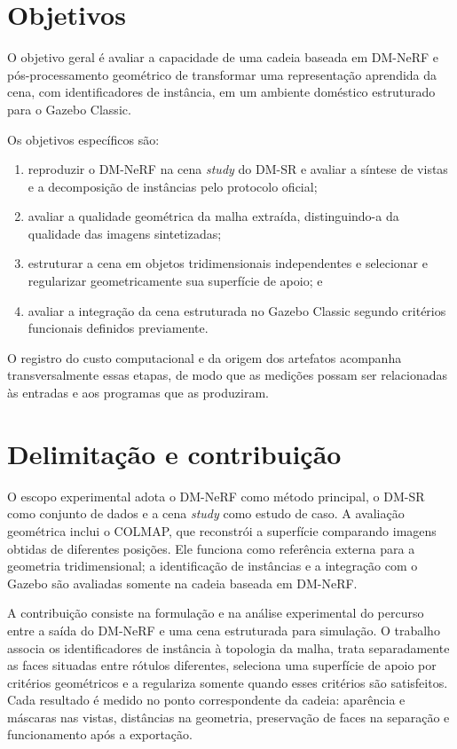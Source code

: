 \section{Objetivos}

O objetivo geral é avaliar a capacidade de uma cadeia baseada em DM-NeRF e pós-processamento geométrico de transformar uma representação aprendida da cena, com identificadores de instância, em um ambiente doméstico estruturado para o Gazebo Classic.

Os objetivos específicos são:
\begin{enumerate}[label=\arabic*)]
  \item reproduzir o DM-NeRF na cena \textit{study} do DM-SR e avaliar a síntese de vistas e a decomposição de instâncias pelo protocolo oficial;
  \item avaliar a qualidade geométrica da malha extraída, distinguindo-a da qualidade das imagens sintetizadas;
  \item estruturar a cena em objetos tridimensionais independentes e selecionar e regularizar geometricamente sua superfície de apoio; e
  \item avaliar a integração da cena estruturada no Gazebo Classic segundo critérios funcionais definidos previamente.
\end{enumerate}

O registro do custo computacional e da origem dos artefatos acompanha transversalmente essas etapas, de modo que as medições possam ser relacionadas às entradas e aos programas que as produziram.

\section{Delimitação e contribuição}

O escopo experimental adota o DM-NeRF como método principal, o DM-SR como conjunto de dados e a cena \textit{study} como estudo de caso. A avaliação geométrica inclui o COLMAP, que reconstrói a superfície comparando imagens obtidas de diferentes posições. Ele funciona como referência externa para a geometria tridimensional; a identificação de instâncias e a integração com o Gazebo são avaliadas somente na cadeia baseada em DM-NeRF.

A contribuição consiste na formulação e na análise experimental do percurso entre a saída do DM-NeRF e uma cena estruturada para simulação. O trabalho associa os identificadores de instância à topologia da malha, trata separadamente as faces situadas entre rótulos diferentes, seleciona uma superfície de apoio por critérios geométricos e a regulariza somente quando esses critérios são satisfeitos. Cada resultado é medido no ponto correspondente da cadeia: aparência e máscaras nas vistas, distâncias na geometria, preservação de faces na separação e funcionamento após a exportação.

